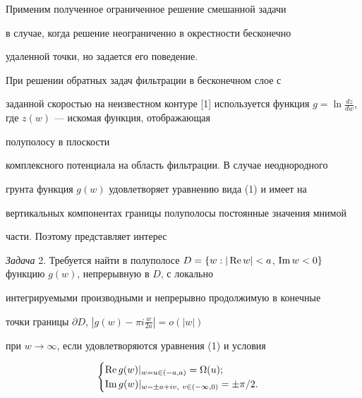Применим полученное ограниченное решение смешанной задачи


в случае, когда решение неограниченно в окрестности бесконечно


удаленной точки, но задается его поведение.





При решении обратных задач фильтрации в бесконечном слое с


заданной скоростью на неизвестном контуре [1] используется функция $g


= \ln \frac{dz}{dw}$, где $z(w)$ --- искомая функция, отображающая


полуполосу в плоскости


комплексного потенциала на область фильтрации. В случае неоднородного


грунта функция $g(w)$ удовлетворяет уравнению вида (1) и имеет на


вертикальных компонентах границы полуполосы постоянные значения мнимой


части. Поэтому представляет интерес


\medskip





{\it Задача} 2. Требуется найти в полуполосе $D = \{w: |\re w| < a$, $\im w


<0\}$ функцию $g(w)$, непрерывную в $D$, с локально


интегрируемыми производными и непрерывно продолжимую в конечные


точки границы $\partial D$, $|g(w) - \pi i \frac{w}{2a}| = o(|w|)$


при $w \to \infty$, если удовлетворяются уравнения (1) и условия


\begin{equation}


\begin{cases}


\re g(w)|_{w=u\in (-a, a)} = \Omega(u);\\


\im g(w)|_{w=\pm a + iv,\ v \in (-\infty,0)} = \pm \pi/2.


\end{cases}


\end{equation}





